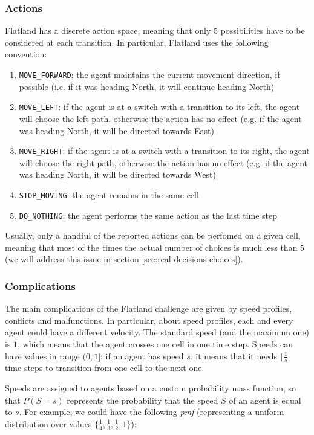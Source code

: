 \documentclass[a4paper,10pt]{report}
\begin{document}
\subsubsection*{Actions}
Flatland has a discrete action space, meaning that only $5$ possibilities have to be considered at each transition. In particular, Flatland uses the following convention:
\begin{enumerate}
	\item \texttt{MOVE_FORWARD}: the agent maintains the current movement direction, if possible (i.e. if it was heading North, it will continue heading North)
	\item \texttt{MOVE_LEFT}: if the agent is at a switch with a transition to its left, the agent will choose the left path, otherwise the action has no effect (e.g. if the agent was heading North, it will be directed towards East)
	\item \texttt{MOVE_RIGHT}: if the agent is at a switch with a transition to its right, the agent will choose the right path, otherwise the action has no effect (e.g. if the agent was heading North, it will be directed towards West)
	\item \texttt{STOP_MOVING}: the agent remains in the same cell
	\item \texttt{DO_NOTHING}: the agent performs the same action as the last time step
\end{enumerate}

Usually, only a handful of the reported actions can be perfomed on a given cell, meaning that most of the times the actual number of choices is much less than $5$ (we will address this issue in section \ref{sec:real-decisions-choices}).

\subsubsection*{Complications}
The main complications of the Flatland challenge are given by speed profiles, conflicts and malfunctions. In particular, about speed profiles, each and every agent could have a different velocity. The standard speed (and the maximum one) is $1$, which means that the agent crosses one cell in one time step. Speeds can have values in range $(0, 1]$: if an agent has speed $s$, it means that it needs $\lceil\frac{1}{s}\rceil$ time steps to transition from one cell to the next one.

Speeds are assigned to agents based on a custom probability mass function, so that $P(S=s)$ represents the probability that the speed $S$ of an agent is equal to $s$. For example, we could have the following \textit{pmf} (representing a uniform distribution over values $\{\frac{1}{4}, \frac{1}{3}, \frac{1}{2}, 1\}$):
\end{document}
